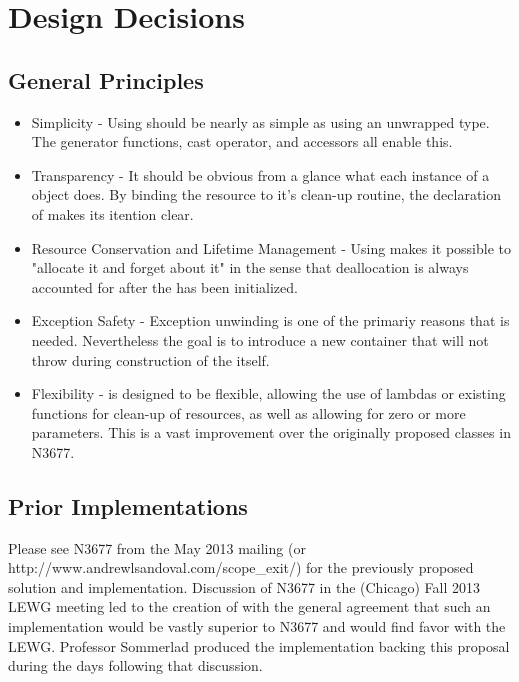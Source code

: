 \documentclass[ebook,11pt,article]{memoir}
\begin{document}
\chapter{Design Decisions}
\section{General Principles}
\begin{itemize}
\item Simplicity - Using  should be nearly as simple as using an unwrapped type.  The generator functions, cast operator, and accessors all enable this.
\item Transparency - It should be obvious from a glance what each instance of a  object does.  By binding the resource to it's clean-up routine, the declaration of  makes its itention clear.
\item Resource Conservation and Lifetime Management - Using  makes it possible to "allocate it and forget about it" in the sense that deallocation is always accounted for after the  has been initialized.
\item Exception Safety - Exception unwinding is one of the primariy reasons that  is needed.  Nevertheless the goal is to introduce a new container that will not throw during construction of the  itself.
\item Flexibility -  is designed to be flexible, allowing the use of lambdas or existing functions for clean-up of resources, as well as allowing for zero or more parameters.  This is a vast improvement over the originally proposed classes in N3677.
\end{itemize}

\section{Prior Implementations}
Please see N3677 from the May 2013 mailing (or http://www.andrewlsandoval.com/scope_exit/) for the previously proposed solution and implementation.  Discussion of N3677 in the (Chicago) Fall 2013 LEWG meeting led to the creation of  with the general agreement that such an implementation would be vastly superior to N3677 and would find favor with the LEWG.  Professor Sommerlad produced the implementation backing this proposal during the days following that discussion.
\end{document}
